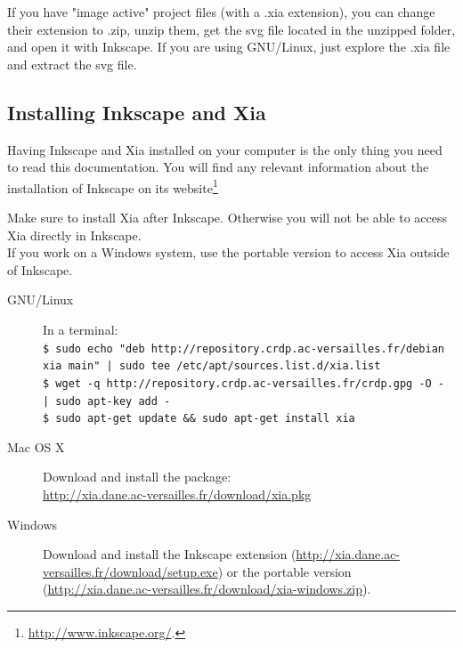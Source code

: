 \begin{tip}
 If you have "image active" project files (with a .xia extension), you can change their extension to .zip,
 unzip them, get the svg file located in the unzipped folder, and open it with Inkscape. If you are using GNU/Linux,
 just explore the .xia file and extract the svg file.
\end{tip}


\subsection{Installing Inkscape and Xia}

Having Inkscape and Xia installed on your computer is the only thing you need 
to read this documentation. You will find any relevant information about the 
installation of Inkscape on its website\footnote{\href{http://www.inkscape.org/}{http://www.inkscape.org/}.}

\begin{alert}
 Make sure to install Xia after Inkscape. Otherwise you will not be able
 to access Xia directly in Inkscape.\\
 If you work on a Windows system, use the portable version to access Xia outside of Inkscape.
\end{alert}

\begin{description}
 \item [GNU/Linux] In a terminal:\\
 \texttt{\$ sudo echo "deb http://repository.crdp.ac-versailles.fr/debian xia main" | sudo tee /etc/apt/sources.list.d/xia.list}\\
 \texttt{\$ wget -q http://repository.crdp.ac-versailles.fr/crdp.gpg -O - | sudo apt-key add -}\\
 \texttt{\$ sudo apt-get update \&\& sudo apt-get install xia}
 \item [Mac OS X] Download and install the package:\\
 \href{http://xia.dane.ac-versailles.fr/download/xia.pkg}{http://xia.dane.ac-versailles.fr/download/xia.pkg}
 \item [Windows] Download and install the Inkscape extension 
 (\href{http://xia.dane.ac-versailles.fr/download/setup.exe}{http://xia.dane.ac-versailles.fr/download/setup.exe}) 
 or the portable version
 (\href{http://xia.dane.ac-versailles.fr/download/xia-windows.zip}{http://xia.dane.ac-versailles.fr/download/xia-windows.zip}).
\end{description}



